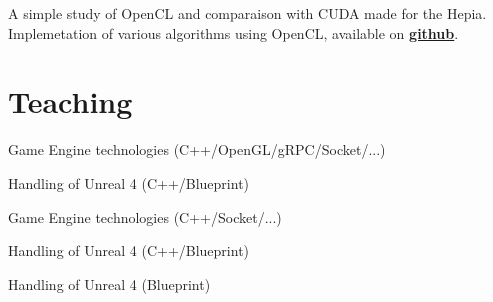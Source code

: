 \documentclass[a4paper]{deedy-resume} %
\begin{document}
\sectionspace %



A simple study of OpenCL and comparaison with CUDA made for the Hepia. Implemetation
of various algorithms using OpenCL, available on
\textbf{\href{https://github.com/anirul/OpenCL_PA_2012}{github}}.

\sectionspace


\section{Teaching}


\begin{tightitemize}
\item Game Engine technologies (C++/OpenGL/gRPC/Socket/...)
\item Handling of Unreal 4 (C++/Blueprint)
\end{tightitemize}

\sectionspace



\begin{tightitemize}
\item Game Engine technologies (C++/Socket/...)
\item Handling of Unreal 4 (C++/Blueprint)
\end{tightitemize}

\sectionspace



\begin{tightitemize}
\item Handling of Unreal 4 (Blueprint)
\end{tightitemize}
\end{document}
